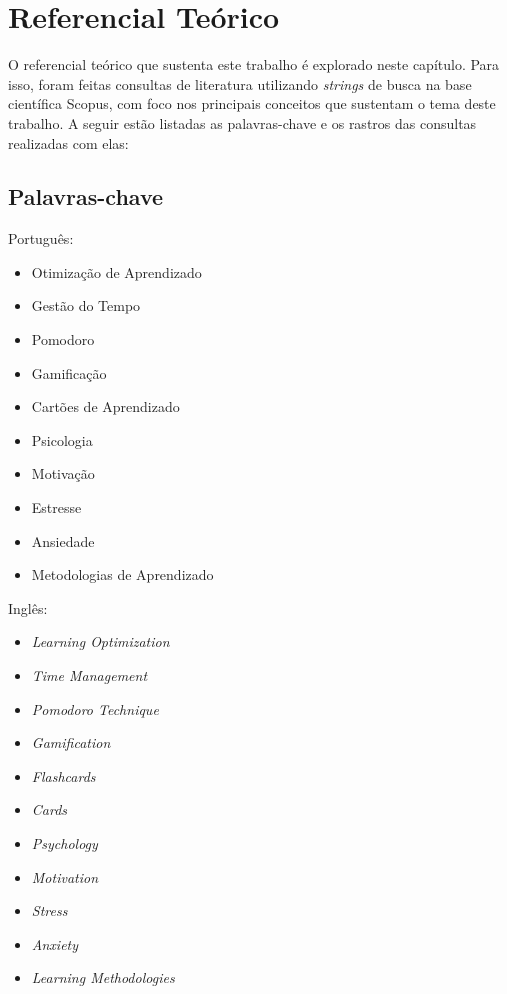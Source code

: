 \chapter{Referencial Teórico}

O referencial teórico que sustenta este trabalho é explorado neste capítulo.
Para isso, foram feitas consultas de literatura utilizando \textit{strings} de busca na base científica Scopus, com foco nos principais conceitos que sustentam o tema deste trabalho.
A seguir estão listadas as palavras-chave e os rastros das consultas realizadas com elas:

\section{Palavras-chave}

Português:

\begin{itemize}
    \item Otimização de Aprendizado
    \item Gestão do Tempo
    \item Pomodoro
    \item Gamificação
    \item Cartões de Aprendizado
    \item Psicologia
    \item Motivação
    \item Estresse
    \item Ansiedade
    \item Metodologias de Aprendizado
\end{itemize}

Inglês:

\begin{itemize}
    \item \textit{Learning Optimization}
    \item \textit{Time Management}
    \item \textit{Pomodoro Technique}
    \item \textit{Gamification}
    \item \textit{Flashcards}
    \item \textit{Cards}
    \item \textit{Psychology}
    \item \textit{Motivation}
    \item \textit{Stress}
    \item \textit{Anxiety}
    \item \textit{Learning Methodologies}
\end{itemize}

